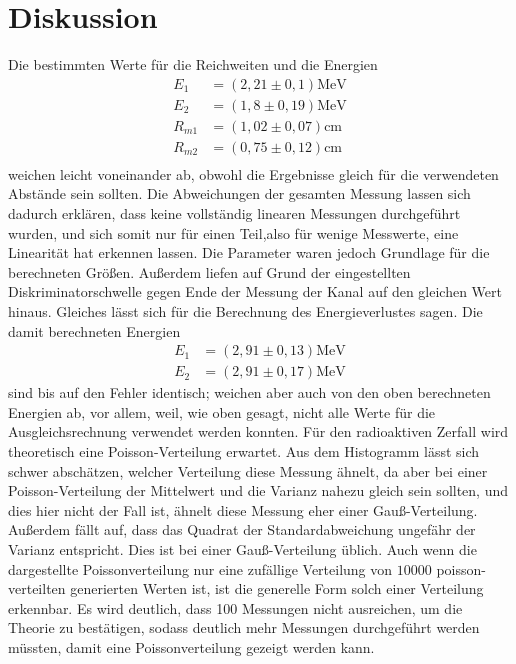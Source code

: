 \section{Diskussion}
\label{sec:Diskussion}

Die bestimmten Werte für die Reichweiten und die Energien
\begin{align*}
E_{1} &= (2,21 \pm 0,1) \si{\MeV}\\
E_{2} &= (1,8 \pm 0,19) \si{\MeV}\\
R_{m1} &= (1,02 \pm 0,07) \si{\centi\meter}\\
R_{m2} &= (0,75 \pm 0,12) \si{\centi\meter}\\
\end{align*}
weichen leicht voneinander ab, obwohl die Ergebnisse gleich für die verwendeten Abstände sein sollten.
Die Abweichungen der gesamten Messung lassen sich dadurch erklären, dass keine vollständig linearen Messungen durchgeführt wurden,
und sich somit nur für einen Teil,also für wenige Messwerte, eine Linearität hat erkennen lassen. Die Parameter waren jedoch Grundlage für die berechneten Größen.
Außerdem liefen auf Grund der eingestellten Diskriminatorschwelle gegen Ende der Messung der Kanal auf den gleichen Wert hinaus.
Gleiches lässt sich für die Berechnung des Energieverlustes sagen. Die damit berechneten Energien
\begin{align*}
E_1 &= (2,91 \pm 0,13) \si{\MeV}\\
E_2 &= (2,91 \pm 0,17) \si{\MeV}
\end{align*}
sind bis auf den Fehler identisch; weichen aber auch von den oben berechneten Energien ab, vor allem, weil, wie oben gesagt, nicht alle Werte für die Ausgleichsrechnung verwendet werden konnten. 
\noindent Für den radioaktiven Zerfall wird theoretisch eine Poisson-Verteilung erwartet. Aus dem Histogramm lässt sich schwer abschätzen, welcher Verteilung diese Messung ähnelt,
da aber bei einer Poisson-Verteilung der Mittelwert und die Varianz nahezu gleich sein sollten, und dies hier nicht der Fall ist, ähnelt diese Messung eher einer Gauß-Verteilung. 
Außerdem fällt auf, dass das Quadrat der Standardabweichung ungefähr der Varianz entspricht. Dies ist bei einer Gauß-Verteilung üblich.
Auch wenn die dargestellte Poissonverteilung nur eine zufällige Verteilung von $10000$ poisson-verteilten generierten Werten ist, ist 
die generelle Form solch einer Verteilung erkennbar. Es wird deutlich, dass
100 Messungen nicht ausreichen, um die Theorie zu bestätigen, sodass
deutlich mehr Messungen durchgeführt werden müssten, damit eine Poissonverteilung gezeigt werden kann.